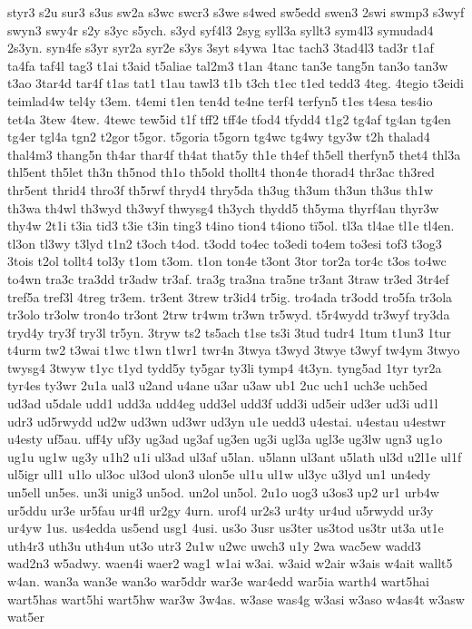 {styr3
s2u
sur3
s3us
sw2a
s3wc
swcr3
s3we
s4wed
sw5edd
swen3
2swi
swmp3
s3wyf
swyn3
swy4r
s2y
s3yc
s5ych.
s3yd
syf4l3
2syg
syll3a
syllt3
sym4l3
symudad4
2s3yn.
syn4fe
s3yr
syr2a
syr2e
s3ys
3syt
s4ywa
1tac
tach3
3tad4l3
tad3r
t1af
ta4fa
taf4l
tag3
t1ai
t3aid
t5aliae
tal2m3
t1an
4tanc
tan3e
tang5n
tan3o
tan3w
t3ao
3tar4d
tar4f
t1as
tat1
t1au
tawl3
t1b
t3ch
t1ec
t1ed
tedd3
4teg.
4tegio
t3eidi
teimlad4w
tel4y
t3em.
t4emi
t1en
ten4d
te4ne
terf4
terfyn5
t1es
t4esa
tes4io
tet4a
3tew
4tew.
4tewc
tew5id
t1f
tff2
tff4e
tfod4
tfydd4
t1g2
tg4af
tg4an
tg4en
tg4er
tgl4a
tgn2
t2gor
t5gor.
t5goria
t5gorn
tg4wc
tg4wy
tgy3w
t2h
thalad4
thal4m3
thang5n
th4ar
thar4f
th4at
that5y
th1e
th4ef
th5ell
therfyn5
thet4
thl3a
thl5ent
th5let
th3n
th5nod
th1o
th5old
thollt4
thon4e
thorad4
thr3ac
th3red
thr5ent
thrid4
thro3f
th5rwf
thryd4
thry5da
th3ug
th3um
th3un
th3us
th1w
th3wa
th4wl
th3wyd
th3wyf
thwysg4
th3ych
thydd5
th5yma
thyrf4au
thyr3w
thy4w
2t1i
t3ia
tid3
t3ie
t3in
ting3
t4ino
tion4
t4iono
t^^ef5ol.
tl3a
tl4ae
tl1e
tl4en.
tl3on
tl3wy
t3lyd
t1n2
t3och
t4od.
t3odd
to4ec
to3edi
to4em
to3esi
tof3
t3og3
3tois
t2ol
tollt4
tol3y
t1om
t3om.
t1on
ton4e
t3ont
3tor
tor2a
tor4c
t3os
to4wc
to4wn
tra3c
tra3dd
tr3adw
tr3af.
tra3g
tra3na
tra5ne
tr3ant
3traw
tr3ed
3tr4ef
tref5a
tref3l
4treg
tr3em.
tr3ent
3trew
tr3id4
tr5ig.
tro4ada
tr3odd
tro5fa
tr3ola
tr3olo
tr3olw
tron4o
tr3ont
2trw
tr4wm
tr3wn
tr5wyd.
t5r4wydd
tr3wyf
try3da
tryd4y
try3f
try3l
tr5yn.
3tryw
ts2
ts5ach
t1se
ts3i
3tud
tudr4
1tum
t1un3
1tur
t4urm
tw2
t3wai
t1wc
t1wn
t1wr1
twr4n
3twya
t3wyd
3twye
t3wyf
tw4ym
3twyo
twysg4
3twyw
t1yc
t1yd
tydd5y
ty5gar
ty3li
tymp4
4t3yn.
tyng5ad
1tyr
tyr2a
tyr4es
ty3wr
2u1a
ual3
u2and
u4ane
u3ar
u3aw
ub1
2uc
uch1
uch3e
uch5ed
ud3ad
u5dale
udd1
udd3a
udd4eg
udd3el
udd3f
udd3i
ud5eir
ud3er
ud3i
ud1l
udr3
ud5rwydd
ud2w
ud3wn
ud3wr
ud3yn
u1e
uedd3
u4estai.
u4estau
u4estwr
u4esty
uf5au.
uff4y
uf3y
ug3ad
ug3af
ug3en
ug3i
ugl3a
ugl3e
ug3lw
ugn3
ug1o
ug1u
ug1w
ug3y
u1h2
u1i
ul3ad
ul3af
u5lan.
u5lann
ul3ant
u5lath
ul3d
u2l1e
ul1f
ul5igr
ull1
u1lo
ul3oc
ul3od
ulon3
ulon5e
ul1u
ul1w
ul3yc
u3lyd
un1
un4edy
un5ell
un5es.
un3i
unig3
un5od.
un2ol
un5ol.
2u1o
uog3
u3os3
up2
ur1
urb4w
ur5ddu
ur3e
ur5fau
ur4fl
ur2gy
4urn.
urof4
ur2s3
ur4ty
ur4ud
u5rwydd
ur3y
ur4yw
1us.
us4edda
us5end
usg1
4usi.
us3o
3usr
us3ter
us3tod
us3tr
ut3a
ut1e
uth4r3
uth3u
uth4un
ut3o
utr3
2u1w
u2wc
uwch3
u1y
2wa
wac5ew
wadd3
wad2n3
w5adwy.
waen4i
waer2
wag1
w1ai
w3ai.
w3aid
w2air
w3ais
w4ait
wallt5
w4an.
wan3a
wan3e
wan3o
war5ddr
war3e
war4edd
war5ia
warth4
wart5hai
wart5has
wart5hi
wart5hw
war3w
3w4as.
w3ase
was4g
w3asi
w3aso
w4as4t
w3asw
wat5er
}
